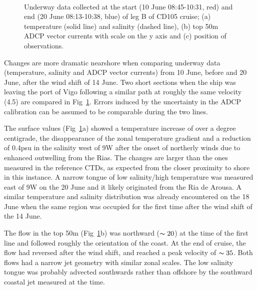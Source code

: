 \begin{figure}[!t]
\centering {}\\
\caption{Underway data collected at the start (10 June
08:45-10:31, red) and end (20 June 08:13-10:38, blue) of leg B of
CD105 cruise;  (a) temperature (solid line) and salinity (dashed
line), (b) top 50m ADCP vector currents with scale on the y axis
and (c) position of observations.} \label{fig:refths}\end{figure}

Changes are more dramatic nearshore when comparing underway data
(temperature, salinity and ADCP vector currents) from 10 June,
before and 20 June, after the wind shift of 14 June. Two short
sections when the ship was leaving the port of Vigo following a
similar path at roughly the same velocity (4.5\vel) are compared
in Fig~\ref{fig:refths}. Errors induced by the uncertainty in the
ADCP calibration can be assumed to be comparable during the two
lines.

The surface values (Fig~\ref{fig:refths}a) showed a temperature
increase of over a degree centigrade, the disappearance of the
zonal temperature gradient and a reduction of 0.4psu in the
salinity west of 9\deg W after the onset of northerly winds due to
enhanced outwelling from the Rias. The changes are larger than the
ones measured in the reference CTDs, as expected from the closer
proximity to shore in this instance. A narrow tongue of low
salinity/high temperature was measured east of 9\deg W on the 20
June and it likely originated from the Ria de Arousa. A similar
temperature and salinity distribution was already encountered on
the 18 June when the same region was occupied for the first time
after the wind shift of the 14 June.

The flow in the top 50m (Fig~\ref{fig:refths}b) was northward
($\thicksim 20$\velc) at the time of the first line and followed
roughly the orientation of the coast. At the end of cruise, the
flow had reversed after the wind shift, and reached a peak
velocity of $\thicksim 35$\velc. Both flows had a narrow jet
geometry with similar zonal scales. The low salinity tongue was
probably advected southwards rather than offshore by the southward
coastal jet measured at the time.

